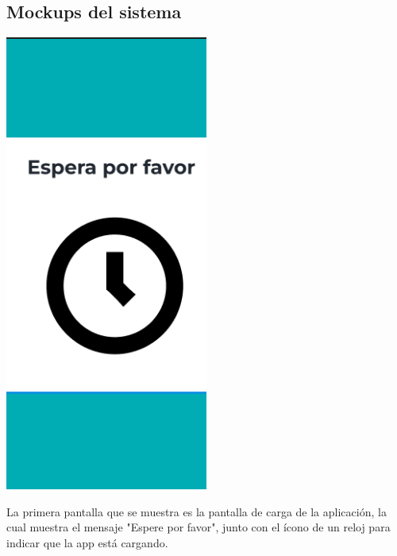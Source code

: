 \subsection{Mockups del sistema}
\begin{center}
    \includegraphics[width=0.5\textwidth]{Images/Cap 3/Pantalla1.png}
\end{center}

La primera pantalla que se muestra es la pantalla de carga de la aplicación, la cual muestra el mensaje "Espere por favor", junto con el ícono de un reloj para indicar que la app está cargando.

